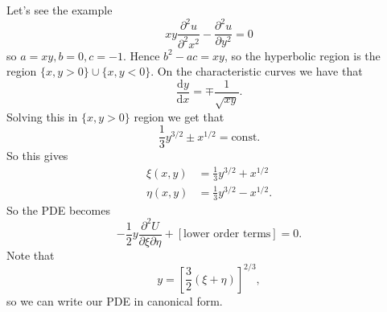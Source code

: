 \documentclass{article}
\begin{document}
Let's see the example
\[
	xy\frac{\partial^2 u}{\partial^2x^2}-\frac{\partial^2 u}{\partial y^2}=0
\]
so $ a=xy, b=0, c=-1 $. Hence $ b^2-ac=xy $, so the hyperbolic region is the region $ \{x,y>0\} \cup \{x,y<0\} $. On the characteristic curves we have that
\[
	\frac{\mathrm dy}{\mathrm dx}=\mp\frac1{\sqrt{xy}}.
\]
Solving this in $ \{x,y>0\} $ region we get that
\[
	\frac 13 y^{3/2}\pm x^{1/2}=\text{const.}
\]
So this gives
\begin{align*}
	\xi(x,y)&=\frac 13 y^{3/2} + x^{1/2}\\
	\eta(x,y)&=\frac 13 y^{3/2} - x^{1/2}.
\end{align*}
So the PDE becomes
\[
	-\frac 12 y\frac{\partial^2 U}{\partial \xi\partial \eta}+[\text{lower order terms}]=0.
\]
Note that
\[
	y=\left[\frac 32(\xi+\eta)\right]^{2/3},
\]
so we can write our PDE in canonical form.
\end{document}

